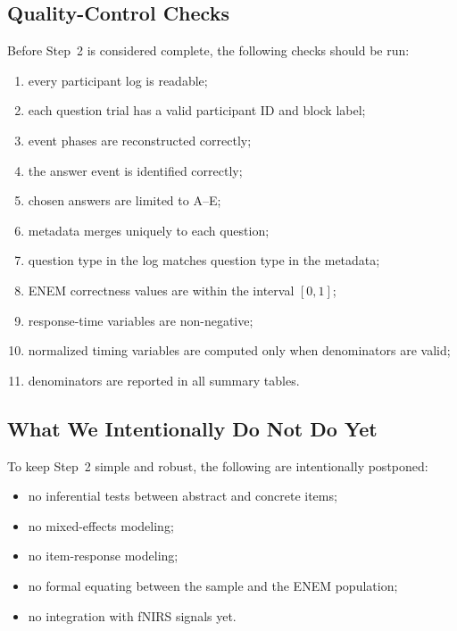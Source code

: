 \subsection{Quality-Control Checks}
Before Step~2 is considered complete, the following checks should be run:
\begin{enumerate}
    \item every participant log is readable;
    \item each question trial has a valid participant ID and block label;
    \item event phases are reconstructed correctly;
    \item the answer event is identified correctly;
    \item chosen answers are limited to A--E;
    \item metadata merges uniquely to each question;
    \item question type in the log matches question type in the metadata;
    \item ENEM correctness values are within the interval $[0,1]$;
    \item response-time variables are non-negative;
    \item normalized timing variables are computed only when denominators are valid;
    \item denominators are reported in all summary tables.
\end{enumerate}

\subsection{What We Intentionally Do Not Do Yet}
To keep Step~2 simple and robust, the following are intentionally postponed:
\begin{itemize}
    \item no inferential tests between abstract and concrete items;
    \item no mixed-effects modeling;
    \item no item-response modeling;
    \item no formal equating between the sample and the ENEM population;
    \item no integration with fNIRS signals yet.
\end{itemize}


